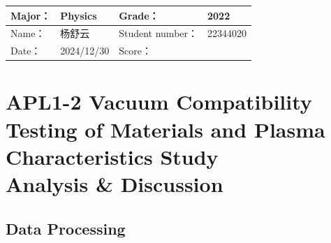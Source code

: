 
\begin{table}
	\renewcommand\arraystretch{1.7}
	\begin{tabularx}{\textwidth}{|X|X|X|X|}
		\hline
		Major：& Physics &Grade：& 2022\\
		\hline
		Name： & 杨舒云 & Student number：& 22344020\\
		\hline
		Date：& 2024/12/30 & Score： &\\
		\hline
	\end{tabularx}
\end{table}
\section{APL1-2 Vacuum Compatibility Testing of Materials and Plasma Characteristics Study \\ Analysis \& Discussion}


\subsection{Data Processing}

